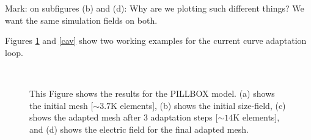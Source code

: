 \documentclass[review,12pt]{elsarticle_summary_report}
\begin{document}
\color{blue} Mark: on subfigures (b) and (d): Why are we plotting such different things? We want the same simulation fields on both. \color{black}



Figures \ref{pill} and \ref{cav} show two working examples for the current curve adaptation loop.
\begin{landscape}
\begin{figure}[ph!]
\centering
{}
\hspace*{50pt}
\\
\hspace*{50pt}
\caption{\label{pill} This Figure shows the results for the PILLBOX model. (a) shows the initial mesh [$\sim3.7\text{K}$ elements], (b) shows the initial size-field, (c) shows the adapted mesh after 3 adaptation steps [$\sim14\text{K}$ elements], and (d) shows the electric field for the final adapted mesh.}
\end{figure}
\end{landscape}
\end{document}
